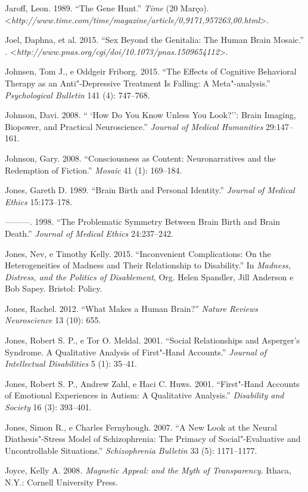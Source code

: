Jaroff, Leon. 1989. ``The Gene Hunt.'' \emph{Time} (20 Março).
\textless{}\emph{http://www.time.com/time/magazine/article/0,9171,957263,00.html}\textgreater{}.

Joel, Daphna, et al. 2015. ``Sex Beyond the Genitalia: The Human Brain
Mosaic.'' \emph{.}
\textless{}\emph{http://www.pnas.org/cgi/doi/10.1073/pnas.1509654112}\textgreater{}.

Johnsen, Tom J., e Oddgeir Friborg. 2015. ``The Effects of Cognitive
Behavioral Therapy as an Anti"-Depressive Treatment Is Falling: A
Meta"-analysis.'' \emph{Psychological Bulletin} 141 (4): 747--768.

Johnson, Davi. 2008. `` `How Do You Know Unless You Look?'': Brain
Imaging, Biopower, and Practical Neuroscience.'' \emph{Journal of
Medical Humanities} 29:147--161.

Johnson, Gary. 2008. ``Consciousness as Content: Neuronarratives and the
Redemption of Fiction.'' \emph{Mosaic} 41 (1): 169--184.

Jones, Gareth D. 1989. ``Brain Birth and Personal Identity.''
\emph{Journal of Medical Ethics} 15:173--178.

---------. 1998. ``The Problematic Symmetry Between Brain Birth and
Brain Death.'' \emph{Journal of Medical Ethics} 24:237--242.

Jones, Nev, e Timothy Kelly. 2015. ``Inconvenient Complications: On the
Heterogeneities of Madness and Their Relationship to Disability.'' In
\emph{Madness, Distress, and the Politics of Disablement}, Org. Helen
Spandler, Jill Anderson e Bob Sapey. Bristol: Policy.

Jones, Rachel. 2012. ``What Makes a Human Brain?'' \emph{Nature Reviews
Neuroscience} 13 (10): 655.

Jones, Robert S. P., e Tor O. Meldal. 2001. ``Social Relationships and
Asperger's Syndrome. A Qualitative Analysis of First"-Hand Accounts.''
\emph{Journal of Intellectual Disabilities} 5 (1): 35--41.

Jones, Robert S. P., Andrew Zahl, e Haci C. Huws. 2001. ``First"-Hand
Accounts of Emotional Experiences in Autism: A Qualitative Analysis.''
\emph{Disability and Society} 16 (3): 393--401.

Jones, Simon R., e Charles Fernyhough. 2007. ``A New Look at the Neural
Diathesis"-Stress Model of Schizophrenia: The Primacy of
Social"-Evaluative and Uncontrollable Situations.'' \emph{Schizophrenia
Bulletin} 33 (5): 1171--1177.

Joyce, Kelly A. 2008\emph{. Magnetic Appeal:  and the Myth of
Transparency}. Ithaca, N.Y.: Cornell University Press.

